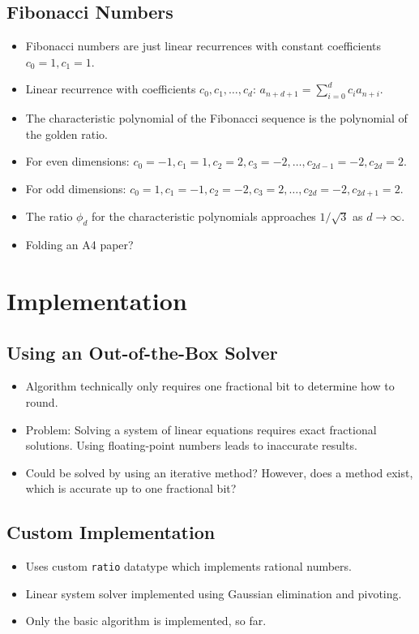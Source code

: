 \documentclass[english,version-2020-11]{uzl-thesis}
\begin{document}
\section{Fibonacci Numbers}

\begin{itemize}
  \item Fibonacci numbers are just linear recurrences with constant coefficients $c_0 = 1, c_1 = 1$.
  \item Linear recurrence with coefficients $c_0, c_1, \dots, c_d$: $a_{n+d+1} = \sum_{i=0}^d c_i a_{n+i}$.
  \item The characteristic polynomial of the Fibonacci sequence is the polynomial of the golden ratio.
  \item For even dimensions: $c_0 = -1, c_1 = 1, c_2 = 2, c_3 = -2, \dots, c_{2d-1} = -2, c_{2d} = 2$.
  \item For odd dimensions:  $c_0 = 1, c_1 = -1, c_2 = -2, c_3 = 2, \dots, c_{2d} = -2, c_{2d+1} = 2$.
  \item The ratio $\phi_d$ for the characteristic polynomials approaches $1/\sqrt{3}$ as $d \to \infty$.
  \item Folding an A4 paper?
\end{itemize}

\chapter{Implementation}

\section{Using an Out-of-the-Box Solver}

\begin{itemize}
  \item Algorithm technically only requires one fractional bit to determine how to round.
  \item Problem: Solving a system of linear equations requires exact fractional solutions.
    Using floating-point numbers leads to inaccurate results.
  \item Could be solved by using an iterative method? However, does a method
    exist, which is accurate up to one fractional bit?
\end{itemize}

\section{Custom Implementation}

\begin{itemize}
  \item Uses custom \texttt{ratio} datatype which implements rational numbers.
  \item Linear system solver implemented using Gaussian elimination and pivoting.
  \item Only the basic algorithm is implemented, so far.
\end{itemize}

\begin{bibtex-entries}
\end{bibtex-entries}
\end{document}
